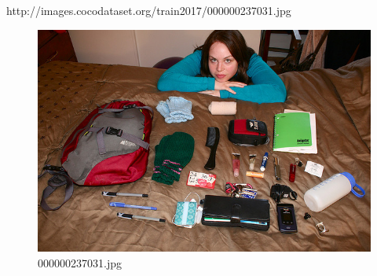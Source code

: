 http://images.cocodataset.org/train2017/000000237031.jpg
\begin{figure}[h]
    \centering
    \includegraphics[width=0.8\linewidth]{../image set/hard/000000237031.jpg}
    \caption{000000237031.jpg}
\end{figure}

